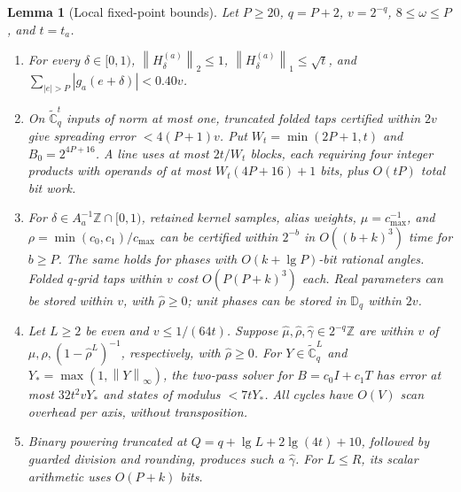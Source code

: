 \documentclass[11pt]{article}
\newtheorem{lemma}[theorem]{Lemma}
\theoremstyle{definition}
\renewcommand{\label}[1]{}%
\newcommand{\Z}{\mathbb{Z}}
\newcommand{\Cg}{\widetilde{\mathbb{C}}}
\newcommand{\Disk}{\mathbb{D}}
\newcommand{\norm}[1]{\left\lVert #1 \right\rVert}
\newcommand{\abs}[1]{\left\lvert #1 \right\rvert}
\begin{document}
\begin{lemma}[Local fixed-point bounds]\label{lem:bridge-fp}
Let $P\ge20$, $q=P+2$, $v=2^{-q}$, $8\le\omega\le P$, and $t=t_a$.
\begin{enumerate}[label=\textup{(\roman*)},leftmargin=*,itemsep=1pt,topsep=2pt]
\item For every $\delta\in[0,1)$,
$\norm{H_\delta^{(a)}}_2\le1$, $\norm{H_\delta^{(a)}}_1\le\sqrt t$, and
$\sum_{\abs{e}>P}\abs{g_a(e+\delta)}<0.40v$.
\item On $\Cg_q^t$ inputs of norm at most one, truncated folded taps
certified within $2v$ give spreading error $<4(P+1)v$.
Put $W_t=\min(2P+1,t)$ and $B_0=2^{4P+16}$.
A line uses at most $2t/W_t$ blocks, each requiring four integer products
with operands of at most $W_t(4P+16)+1$ bits, plus $O(tP)$ total bit work.
\item For $\delta\in A_a^{-1}\Z\cap[0,1)$, retained kernel samples,
alias weights, $\mu=c_{\max}^{-1}$, and
$\rho=\min(c_0,c_1)/c_{\max}$ can be certified within $2^{-b}$ in
$O((b+k)^3)$ time for $b\ge P$.
The same holds for phases with $O(k+\lg P)$-bit rational angles.
Folded $q$-grid taps within $v$ cost $O(P(P+k)^3)$ each.
Real parameters can be stored within $v$, with $\hat\rho\ge0$;
unit phases can be stored in $\Disk_q$ within $2v$.
\item Let $L\ge2$ be even and $v\le1/(64t)$.
Suppose $\hat\mu,\hat\rho,\hat\gamma\in2^{-q}\Z$ are within $v$ of
$\mu,\rho,(1-\hat\rho^L)^{-1}$, respectively, with $\hat\rho\ge0$.
For $Y\in\Cg_q^L$ and $Y_*=\max(1,\norm{Y}_\infty)$, the two-pass solver
for $B=c_0I+c_1T$ has error at most $32t^2vY_*$ and states of modulus $<7tY_*$.
All cycles have $O(V)$ scan overhead per axis, without transposition.
\item Binary powering truncated at
$Q=q+\lg L+2\lg(4t)+10$, followed by guarded division and rounding,
produces such a $\hat\gamma$.
For $L\le R$, its scalar arithmetic uses $O(P+k)$ bits.
\end{enumerate}
\end{lemma}
\end{document}
